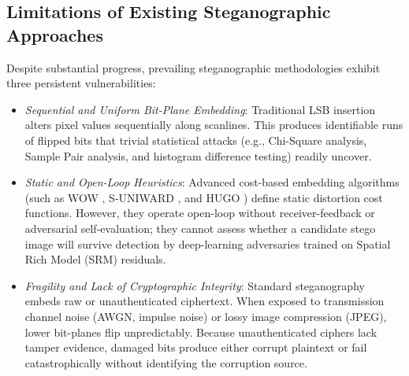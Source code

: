 \documentclass[conference]{IEEEtran}
\begin{document}
\subsection{Limitations of Existing Steganographic Approaches}
Despite substantial progress, prevailing steganographic methodologies exhibit three persistent vulnerabilities:
\begin{itemize}
    \item \textit{Sequential and Uniform Bit-Plane Embedding}: Traditional LSB insertion alters pixel values sequentially along scanlines. This produces identifiable runs of flipped bits that trivial statistical attacks (e.g., Chi-Square analysis, Sample Pair analysis, and histogram difference testing) readily uncover.
    \item \textit{Static and Open-Loop Heuristics}: Advanced cost-based embedding algorithms (such as WOW \cite{holub2012designing}, S-UNIWARD \cite{holub2014universal}, and HUGO \cite{pevny2010using}) define static distortion cost functions. However, they operate open-loop without receiver-feedback or adversarial self-evaluation; they cannot assess whether a candidate stego image will survive detection by deep-learning adversaries trained on Spatial Rich Model (SRM) residuals.
    \item \textit{Fragility and Lack of Cryptographic Integrity}: Standard steganography embeds raw or unauthenticated ciphertext. When exposed to transmission channel noise (AWGN, impulse noise) or lossy image compression (JPEG), lower bit-planes flip unpredictably. Because unauthenticated ciphers lack tamper evidence, damaged bits produce either corrupt plaintext or fail catastrophically without identifying the corruption source.
\end{itemize}
\end{document}
